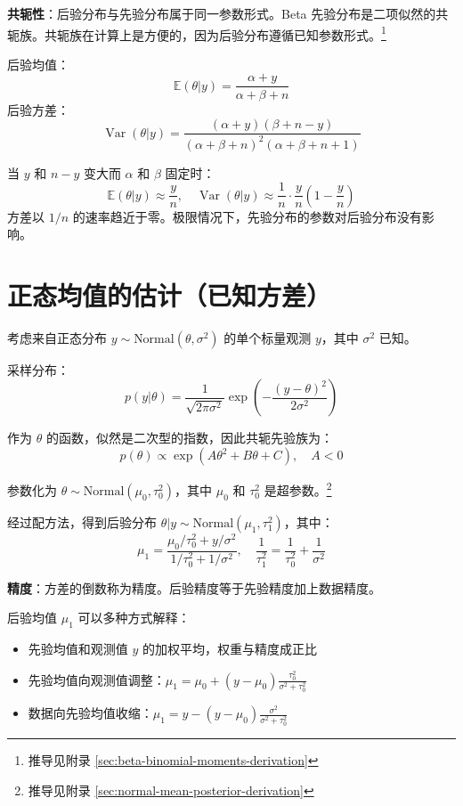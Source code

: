 \textbf{共轭性}：后验分布与先验分布属于同一参数形式。Beta 先验分布是二项似然的共轭族。共轭族在计算上是方便的，因为后验分布遵循已知参数形式。\footnote{推导见附录 \cref{sec:beta-binomial-moments-derivation}}

后验均值：
\[
\mathbb{E}(\theta|y) = \frac{\alpha+y}{\alpha+\beta+n}
\]
后验方差：
\[
\operatorname{Var}(\theta|y) = \frac{(\alpha+y)(\beta+n-y)}{(\alpha+\beta+n)^2(\alpha+\beta+n+1)}
\]

当 $y$ 和 $n-y$ 变大而 $\alpha$ 和 $\beta$ 固定时：
\[
\mathbb{E}(\theta|y) \approx \frac{y}{n}, \quad \operatorname{Var}(\theta|y) \approx \frac{1}{n} \cdot \frac{y}{n}\left(1-\frac{y}{n}\right)
\]
方差以 $1/n$ 的速率趋近于零。极限情况下，先验分布的参数对后验分布没有影响。

\section{正态均值的估计（已知方差）}

考虑来自正态分布 $y \sim \text{Normal}(\theta, \sigma^2)$ 的单个标量观测 $y$，其中 $\sigma^2$ 已知。

采样分布：
\[
p(y|\theta) = \frac{1}{\sqrt{2\pi\sigma^2}} \exp\left(-\frac{(y-\theta)^2}{2\sigma^2}\right)
\]

作为 $\theta$ 的函数，似然是二次型的指数，因此共轭先验族为：
\[
p(\theta) \propto \exp(A\theta^2 + B\theta + C), \quad A < 0
\]

参数化为 $\theta \sim \text{Normal}(\mu_0, \tau_0^2)$，其中 $\mu_0$ 和 $\tau_0^2$ 是超参数。\footnote{推导见附录 \cref{sec:normal-mean-posterior-derivation}}

经过配方法，得到后验分布 $\theta|y \sim \text{Normal}(\mu_1, \tau_1^2)$，其中：
\[
\mu_1 = \frac{\mu_0/\tau_0^2 + y/\sigma^2}{1/\tau_0^2 + 1/\sigma^2}, \quad \frac{1}{\tau_1^2} = \frac{1}{\tau_0^2} + \frac{1}{\sigma^2}
\]

\textbf{精度}：方差的倒数称为精度。后验精度等于先验精度加上数据精度。

后验均值 $\mu_1$ 可以多种方式解释：
\begin{itemize}
  \item 先验均值和观测值 $y$ 的加权平均，权重与精度成正比
  \item 先验均值向观测值调整：$\mu_1 = \mu_0 + (y-\mu_0)\frac{\tau_0^2}{\sigma^2+\tau_0^2}$
  \item 数据向先验均值收缩：$\mu_1 = y - (y-\mu_0)\frac{\sigma^2}{\sigma^2+\tau_0^2}$
\end{itemize}

